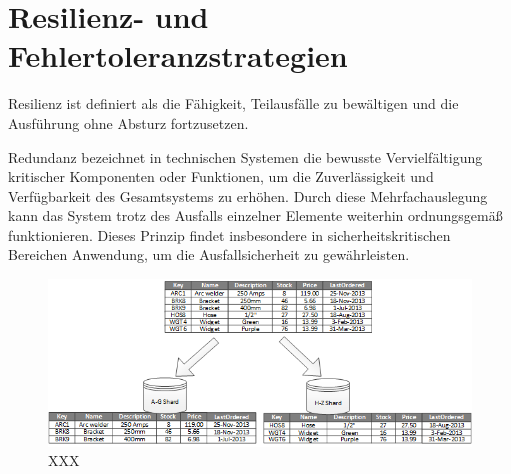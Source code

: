 \section{Resilienz- und Fehlertoleranzstrategien}

Resilienz ist definiert als die Fähigkeit, Teilausfälle zu bewältigen und die Ausführung ohne Absturz fortzusetzen.

Redundanz bezeichnet in technischen Systemen die bewusste Vervielfältigung kritischer Komponenten oder Funktionen,
um die Zuverlässigkeit und Verfügbarkeit des Gesamtsystems zu erhöhen.
Durch diese Mehrfachauslegung kann das System trotz des Ausfalls einzelner Elemente weiterhin ordnungsgemäß
funktionieren.
Dieses Prinzip findet insbesondere in sicherheitskritischen Bereichen Anwendung, um die Ausfallsicherheit
zu gewährleisten.

\begin{figure}[t]
    \centering
    \includegraphics[width=\linewidth]{images/1}
    \caption{XXX}
    \label{fig:1}
\end{figure}

